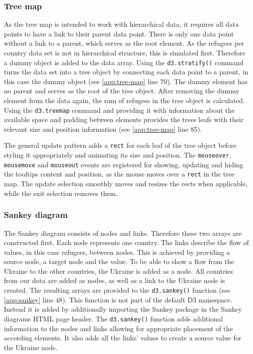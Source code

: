 \subsubsection{Tree map}
As the tree map is intended to work with hierarchical data, it requires all data points to have a link to their parent data point. There is only one data point without a link to a parent, which serves as the root element. As the refugees per country data set is not in hierarchical structure, this is simulated first. Therefore a dummy object is added to the data array. Using the \texttt{d3.stratify()} command turns the data set into a tree object by connecting each data point to a parent, in this case the dummy object (see \ref{app:tree-map} line 70). The dummy element has no parent and serves as the root of the tree object. After removing the dummy element from the data again, the sum of refugees in the tree object is calculated. Using the \texttt{d3.treemap} command and providing it with information about the available space and padding between elements provides the trees leafs with their relevant size and position information (see \ref{app:tree-map} line 85).

The general update pattern adds a \texttt{rect} for each leaf of the tree object before styling it appropriately and animating its size and position. The \texttt{mouseover}, \texttt{mousemove} and \texttt{mouseout} events are registered for showing, updating and hiding the tooltips content and position, as the mouse moves over a \texttt{rect} in the tree map. The update selection smoothly moves and resizes the rects when applicable, while the exit selection removes them.


\subsubsection{Sankey diagram}
The Sankey diagram consists of nodes and links. Therefore these two arrays are constructed first. Each node represents one country. The links describe the flow of values, in this case refugees, between nodes. This is achieved by providing a source node, a target node and the value. To be able to show a flow from the Ukraine to the other countries, the Ukraine is added as a node. All countries from our data are added as nodes, as well as a link to the Ukraine node is created. The resulting arrays are provided to the \texttt{d3.sankey()} function (see \ref{app:sankey} line 48). This function is not part of the default D3 namespace. Instead it is added by additionally importing the Sankey package in the Sankey diagrams HTML page header. The \texttt{d3.sankey()} function adds additional information to the nodes and links allowing for appropriate placement of the according elements. It also adds all the links' values to create a source value for the Ukraine node.

